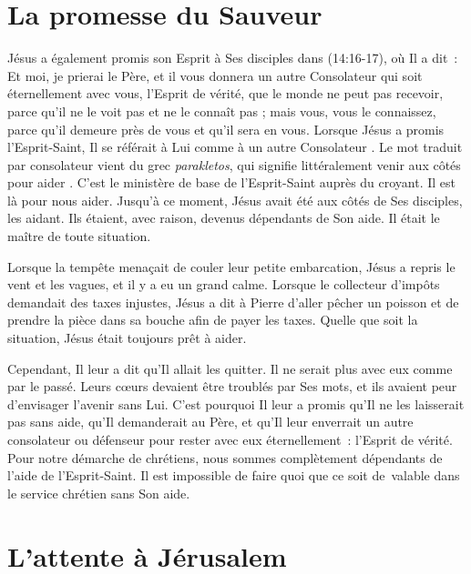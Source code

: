 \section{La promesse du Sauveur}

\begin{specialpar}{\BRallowhypbch}
Jésus a également promis son Esprit à Ses disciples dans
 (14:16-17), où Il a dit~:
 \Og Et moi, je prierai le Père, et il vous donnera un autre Consolateur
 qui soit éternellement avec vous, l'Esprit de vérité, que le monde ne peut
 pas recevoir, parce qu'il ne le voit pas et ne le connaît pas ; mais vous,
 vous le connaissez, parce qu'il demeure près de vous
 et qu'il sera en vous. \Fg{}
 Lorsque Jésus a promis l'Esprit-Saint, Il se référait à Lui comme à
 \Og un autre Consolateur \Fg{}.
 Le mot traduit par \Og consolateur \Fg{} vient du grec \emph{parakletos},
 qui signifie littéralement \Og venir aux côtés pour aider \Fg{}.
 C'est le ministère de base de l'Esprit-Saint auprès du croyant.
 Il est là pour nous aider. Jusqu'à ce moment, Jésus avait été aux côtés
 de Ses disciples, les aidant. Ils étaient, avec raison, devenus dépendants
 de Son aide. Il était le maître de toute situation.
\end{specialpar}

Lorsque la tempête menaçait de couler leur petite embarcation, Jésus
 a repris le vent et les vagues, et il y a eu un grand calme.
 Lorsque le collecteur d'impôts demandait des taxes injustes,
 Jésus a dit à Pierre d'aller pêcher un poisson et de prendre
 la pièce dans sa bouche afin de payer les taxes.
 Quelle que soit la situation, Jésus était toujours prêt à aider.

Cependant, Il leur a dit qu'Il allait les quitter.
 Il ne serait plus avec eux comme par le passé.
 Leurs cœurs devaient être troublés par Ses mots,
 et ils avaient peur d'envisager l'avenir sans Lui.
 C'est pourquoi Il leur a promis qu'Il ne les laisserait pas sans aide,
 qu'Il demanderait au Père, et qu'Il leur enverrait un autre consolateur
 ou défenseur pour rester avec eux éternellement~:
 l'Esprit de vérité.
 Pour notre démarche de chrétiens, nous sommes complètement dépendants de
 l'aide de l'Esprit-Saint.
 Il est impossible de faire quoi que ce soit de~valable dans le service
 chrétien sans Son aide.

\section{L'attente \`a J\'erusalem}

